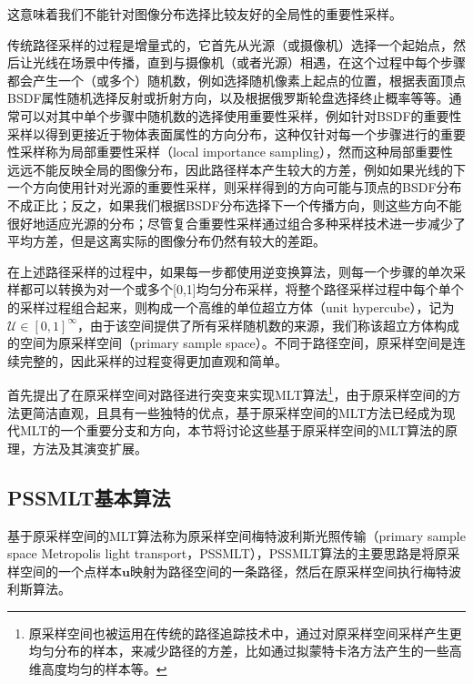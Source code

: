 这意味着我们不能针对图像分布选择比较友好的全局性的重要性采样。

传统路径采样的过程是增量式的，它首先从光源（或摄像机）选择一个起始点，然后让光线在场景中传播，直到与摄像机（或者光源）相遇，在这个过程中每个步骤都会产生一个（或多个）随机数，例如选择随机像素上起点的位置，根据表面顶点BSDF属性随机选择反射或折射方向，以及根据俄罗斯轮盘选择终止概率等等。通常可以对其中单个步骤中随机数的选择使用重要性采样，例如针对BSDF的重要性采样以得到更接近于物体表面属性的方向分布，这种仅针对每一个步骤进行的重要性采样称为局部重要性采样（local importance sampling），然而这种局部重要性远远不能反映全局的图像分布，因此路径样本产生较大的方差，例如如果光线的下一个方向使用针对光源的重要性采样，则采样得到的方向可能与顶点的BSDF分布不成正比；反之，如果我们根据BSDF分布选择下一个传播方向，则这些方向不能很好地适应光源的分布；尽管复合重要性采样通过组合多种采样技术进一步减少了平均方差，但是这离实际的图像分布仍然有较大的差距。

在上述路径采样的过程中，如果每一步都使用逆变换算法，则每一个步骤的单次采样都可以转换为对一个或多个[0,1]均匀分布采样，将整个路径采样过程中每个单个的采样过程组合起来，则构成一个高维的单位超立方体（unit hypercube），记为$\mathcal{U}\in[0,1]^{\infty}$，由于该空间提供了所有采样随机数的来源，我们称该超立方体构成的空间为原采样空间（primary sample space）。不同于路径空间，原采样空间是连续完整的，因此采样的过程变得更加直观和简单。

\cite{a:ASimpleandRobustMutationStrategyfortheMetropolisLightTransportAlgorithm}首先提出了在原采样空间对路径进行突变来实现MLT算法\footnote{原采样空间也被运用在传统的路径追踪技术中，通过对原采样空间采样产生更均匀分布的样本，来减少路径的方差，比如通过拟蒙特卡洛方法产生的一些高维高度均匀的样本等。}，由于原采样空间的方法更简洁直观，且具有一些独特的优点，基于原采样空间的MLT方法已经成为现代MLT的一个重要分支和方向，本节将讨论这些基于原采样空间的MLT算法的原理，方法及其演变扩展。





\subsection{PSSMLT基本算法}\label{sec:mlt-pssmlt}
基于原采样空间的MLT算法称为原采样空间梅特波利斯光照传输（primary sample space Metropolis light transport，PSSMLT），PSSMLT算法的主要思路是将原采样空间的一个点样本$\mathbf{u}$映射为路径空间的一条路径，然后在原采样空间执行梅特波利斯算法。

